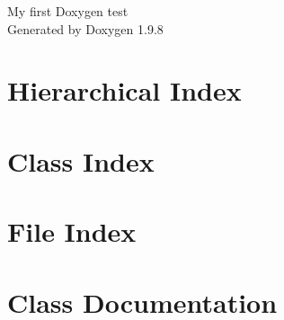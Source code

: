 \documentclass[twoside]{book}
\newcommand{\+}{\discretionary{\mbox{\scriptsize$\hookleftarrow$}}{}{}}
\newcommand{\clearemptydoublepage}{%
    \newpage{\pagestyle{empty}\cleardoublepage}%
  }
\begin{document}
  \raggedbottom
    \hypersetup{pageanchor=false,
                bookmarksnumbered=true,
                pdfencoding=unicode
               }
  \begin{titlepage}
  \vspace*{7cm}
  \begin{center}%
  {\Large My first Doxygen test}\\
  \vspace*{1cm}
  {\large Generated by Doxygen 1.9.8}\\
  \end{center}
  \end{titlepage}
  \clearemptydoublepage
  \tableofcontents
  \clearemptydoublepage
  \hypersetup{pageanchor=true}
\chapter{Hierarchical Index}

\chapter{Class Index}

\chapter{File Index}

\chapter{Class Documentation}
















\end{document}
